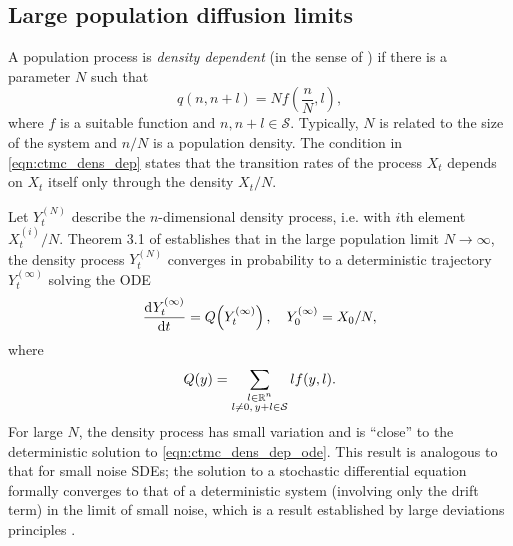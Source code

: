 \subsection{Large population diffusion limits}

A population process is \emph{density dependent} (in the sense of \citet{Kurtz_1970_SolutionsOrdinaryDifferential}) if there is a parameter \(N\) such that
\begin{equation}
	q\!\left(n, n+l\right) = Nf\!\left(\frac{n}{N}, l\right),
	\label{eqn:ctmc_dens_dep}
\end{equation}
where \(f\) is a suitable function and \(n, n+l \in \mathcal{S}\).
Typically, \(N\) is related to the size of the system and \(n / N\) is a population density.
The condition in \cref{eqn:ctmc_dens_dep} states that the transition rates of the process \(X_t\) depends on \(X_t\) itself only through the density \(X_t / N\).

Let \(Y_t^{(N)}\) describe the \(n\)-dimensional density process, i.e. with \(i\)th element \(X_t^{(i)} / N\).
Theorem 3.1 of \citet{Kurtz_1970_SolutionsOrdinaryDifferential} establishes that in the large population limit \(N \to \infty\), the density process \(Y_t^{(N)}\) converges in probability to a deterministic trajectory \(Y_t^{(\infty)}\) solving the ODE
\begin{equation}
	\dod{Y_t^{(\infty)}}{t} = Q\!\left(Y_t^{(\infty)}\right), \quad Y_0^{(\infty)} = X_0 / N,
	\label{eqn:ctmc_dens_dep_ode}
\end{equation}
where
\[
	Q\!\left(y\right) = \sum_{\substack{l \in \mathbb{R}^n \\ l \neq 0,\, y + l \in \mathcal{S}}}{l f\!\left(y, l\right)}.
\]
For large \(N\), the density process has small variation and is ``close'' to the deterministic solution to \eqref{eqn:ctmc_dens_dep_ode}.
This result is analogous to that for small noise SDEs; the solution to a stochastic differential equation formally converges to that of a deterministic system (involving only the drift term) in the limit of small noise, which is a result established by large deviations principles \citep[e.g]{FreidlinWentzell_1998_RandomPerturbationsDynamical}.

